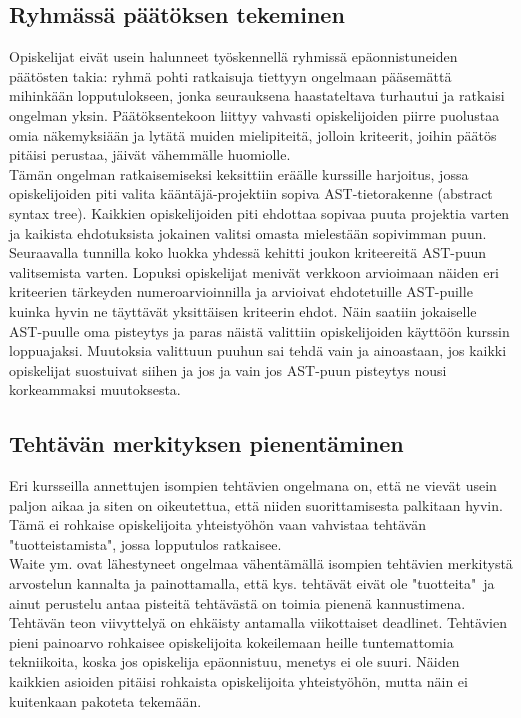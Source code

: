 \documentclass[finnish]{article}
\begin{document}
\subsection{Ryhmässä päätöksen tekeminen}

Opiskelijat eivät usein halunneet työskennellä ryhmissä epäonnistuneiden päätösten takia: ryhmä pohti ratkaisuja tiettyyn ongelmaan pääsemättä mihinkään lopputulokseen, jonka seurauksena haastateltava turhautui ja ratkaisi ongelman yksin. Päätöksentekoon liittyy vahvasti opiskelijoiden piirre puolustaa omia näkemyksiään ja lytätä muiden mielipiteitä, jolloin kriteerit, joihin päätös pitäisi perustaa, jäivät vähemmälle huomiolle.\\

Tämän ongelman ratkaisemiseksi keksittiin eräälle kurssille harjoitus, jossa opiskelijoiden piti valita kääntäjä-projektiin sopiva AST-tietorakenne (abstract syntax tree). Kaikkien opiskelijoiden piti ehdottaa sopivaa puuta projektia varten ja kaikista ehdotuksista jokainen valitsi omasta mielestään sopivimman puun. Seuraavalla tunnilla koko luokka yhdessä kehitti joukon kriteereitä AST-puun valitsemista varten. Lopuksi opiskelijat menivät verkkoon arvioimaan näiden eri kriteerien tärkeyden numeroarvioinnilla ja arvioivat ehdotetuille AST-puille kuinka hyvin ne täyttävät yksittäisen kriteerin ehdot. Näin saatiin jokaiselle AST-puulle oma pisteytys ja paras näistä valittiin opiskelijoiden käyttöön kurssin loppuajaksi. Muutoksia valittuun puuhun sai tehdä vain ja ainoastaan, jos kaikki opiskelijat suostuivat siihen ja jos ja vain jos AST-puun pisteytys nousi korkeammaksi muutoksesta.

\subsection{Tehtävän merkityksen pienentäminen}

Eri kursseilla annettujen isompien tehtävien ongelmana on, että ne vievät usein paljon aikaa ja siten on oikeutettua, että niiden suorittamisesta palkitaan hyvin. Tämä ei rohkaise opiskelijoita yhteistyöhön vaan vahvistaa tehtävän "tuotteistamista", jossa lopputulos ratkaisee.\\

Waite ym. ovat lähestyneet ongelmaa vähentämällä isompien tehtävien merkitystä arvostelun kannalta ja painottamalla, että kys. tehtävät eivät ole "tuotteita"~ja ainut perustelu antaa pisteitä tehtävästä on toimia pienenä kannustimena. Tehtävän teon viivyttelyä on ehkäisty antamalla viikottaiset deadlinet. Tehtävien pieni painoarvo rohkaisee opiskelijoita kokeilemaan heille tuntemattomia tekniikoita, koska jos opiskelija epäonnistuu, menetys ei ole suuri. Näiden kaikkien asioiden pitäisi rohkaista opiskelijoita yhteistyöhön, mutta näin ei kuitenkaan pakoteta tekemään.\\
\end{document}
